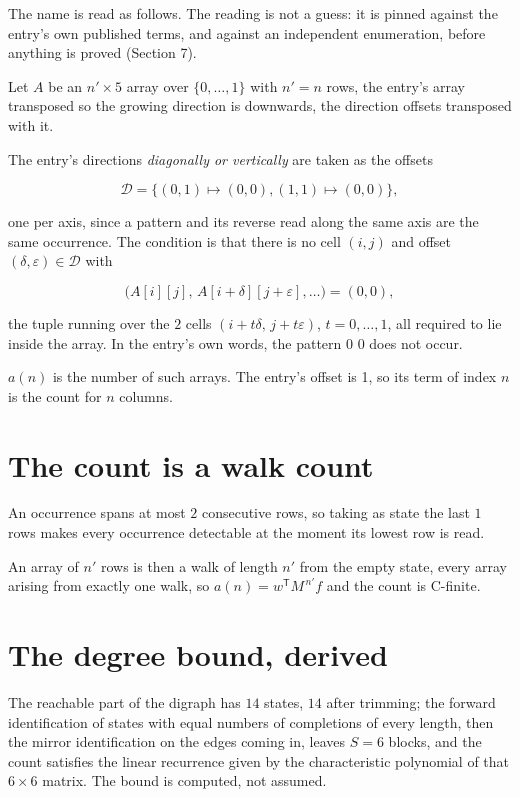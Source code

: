 \documentclass[11pt]{article}
\theoremstyle{definition}
\begin{document}
The name is read as follows. The reading is not a guess: it is pinned against the entry's own published terms, and against an independent enumeration, before anything is proved (Section 7).

Let $A$ be an $n' \times 5$ array over $\{0,\dots,1\}$ with $n' = n$ rows, the entry's array transposed so the growing direction is downwards, the direction offsets transposed with it.

The entry's directions {\itshape diagonally or vertically} are taken as the offsets

\[\mathcal{D} = \{(0,1)\mapsto(0,0), (1,1)\mapsto(0,0)\},\]

one per axis, since a pattern and its reverse read along the same axis are the same occurrence. The condition is that there is no cell $(i,j)$ and offset $(\delta,\varepsilon)\in\mathcal{D}$ with

\[\bigl(A[i][j],\,A[i{+}\delta][j{+}\varepsilon],\dots\bigr) = (0, 0),\]

the tuple running over the $2$ cells $(i+t\delta,\,j+t\varepsilon)$, $t = 0,\dots,1$, all required to lie inside the array. In the entry's own words, the pattern 0 0 does not occur.

$a(n)$ is the number of such arrays. The entry's offset is 1, so its term of index $n$ is the count for $n$ columns.

\section{The count is a walk count}

An occurrence spans at most $2$ consecutive rows, so taking as state the last $1$ rows makes every occurrence detectable at the moment its lowest row is read.

An array of $n'$ rows is then a walk of length $n'$ from the empty state, every array arising from exactly one walk, so $a(n) = w^{\mathsf T}M^{\,n'}f$ and the count is C-finite.

\section{The degree bound, derived}

The reachable part of the digraph has $14$ states, $14$ after trimming; the forward identification of states with equal numbers of completions of every length, then the mirror identification on the edges coming in, leaves $S = 6$ blocks, and the count satisfies the linear recurrence given by the characteristic polynomial of that $6\times6$ matrix. The bound is computed, not assumed.
\end{document}
